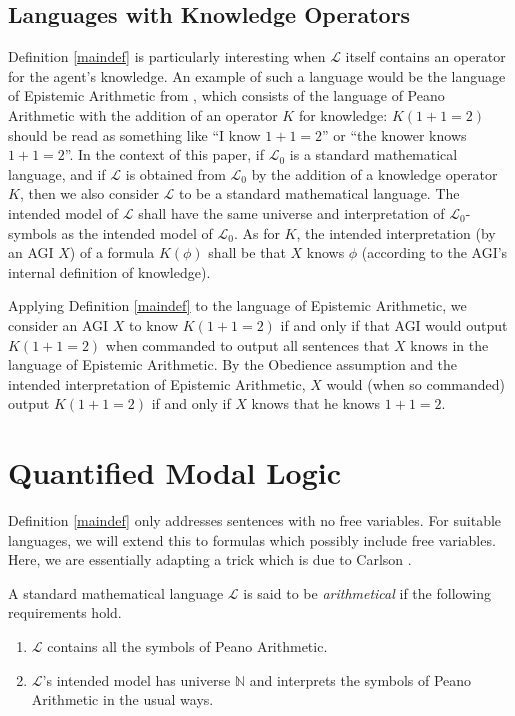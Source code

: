 \documentclass[runningheads]{llncs}
\begin{document}
\subsection{Languages with Knowledge Operators}

Definition \ref{maindef} is particularly interesting when $\mathscr L$ itself
contains an operator for the agent's knowledge. An example of such a language would be
the language of Epistemic Arithmetic from \cite{shapiro}, which consists of the
language of Peano Arithmetic with the addition of an operator $K$ for knowledge:
$K(1+1=2)$ should be read as something like
``I know $1+1=2$'' or ``the knower knows $1+1=2$''. In the context of this paper,
if $\mathscr L_0$ is a standard mathematical language, and if $\mathscr L$ is obtained
from $\mathscr L_0$ by the addition of a knowledge operator $K$, then we also
consider $\mathscr L$ to be a standard mathematical language. The intended model
of $\mathscr L$ shall have the same universe and interpretation of
$\mathscr L_0$-symbols as the intended model of $\mathscr L_0$. As for $K$,
the intended interpretation (by an AGI $X$) of a formula $K(\phi)$ shall be
that $X$ knows $\phi$ (according to the AGI's internal definition of knowledge).

\begin{example}
Applying Definition \ref{maindef} to the language of Epistemic Arithmetic,
we consider an AGI $X$ to know $K(1+1=2)$ if and only if that AGI would output
$K(1+1=2)$ when commanded to output all sentences that $X$ knows in the language of
Epistemic Arithmetic. By the Obedience assumption and the intended interpretation of
Epistemic Arithmetic, $X$ would (when so commanded)
output $K(1+1=2)$ if and only if $X$ knows that he knows $1+1=2$.
\end{example}

\section{Quantified Modal Logic}
\label{quantifiedsection}

Definition \ref{maindef} only addresses sentences with no free variables.
For suitable languages, we will extend this to formulas which possibly include
free variables. Here, we are essentially adapting a trick which is due to
Carlson \cite{carlson}.

\begin{definition}
  A standard mathematical language $\mathscr L$ is said to be \emph{arithmetical}
  if the following requirements hold.
  \begin{enumerate}
    \item $\mathscr L$ contains all the symbols of Peano Arithmetic.
    \item $\mathscr L$'s intended model has universe $\mathbb N$ and interprets
    the symbols of Peano Arithmetic in the usual ways.
  \end{enumerate}
\end{definition}
\end{document}
